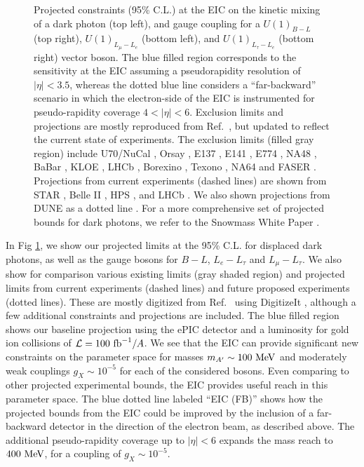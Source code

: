\begin{figure}[t!]
    \caption[Projected constraints at the EIC on the kinetic mixing of a dark photon and gauge strength of anomaly-free abelian theories.]{Projected constraints  (95\% C.L.) at the EIC on the kinetic mixing of a dark photon (top left), and gauge coupling for a $U(1)_{B-L}$ (top right), $U(1)_{L_\mu - L_e}$ (bottom left), and $U(1)_{L_\tau - L_e}$ (bottom right) vector boson. The blue filled region corresponds to the sensitivity at the EIC assuming a pseudorapidity resolution of $|\eta| < 3.5$, whereas the dotted blue line considers a ``far-backward'' scenario in which the electron-side of the EIC is instrumented for pseudo-rapidity coverage $4 < |\eta| < 6$. Exclusion limits and projections are mostly reproduced from Ref.~\cite{Bauer:2018onh}, but updated to reflect the current state of experiments. The exclusion limits (filled gray region) include U70/NuCal \cite{Blumlein:2011mv,Blumlein:2013cua}, Orsay \cite{Davier:1989wz}, E137 \cite{Bjorken:1988as}, E141 \cite{Riordan:1987aw}, E774 \cite{Bross:1989mp}, NA48 \cite{NA482:2015wmo},  BaBar \cite{BaBar:2009lbr,BaBar:2014zli}, KLOE \cite{KLOE-2:2011hhj,KLOE-2:2012lii,KLOE-2:2016ydq}, LHCb \cite{LHCb:2017trq}, Borexino \cite{Harnik:2012ni}, Texono \cite{Lindner:2018kjo}, NA64 \cite{Banerjee:2019pds} and FASER \cite{FASER:2018eoc}. Projections from current experiments (dashed lines) are shown from STAR \cite{Xu:2022qme}, Belle II \cite{Belle-II:2018jsg}, HPS \cite{Baltzell:2022rpd}, and LHCb \cite{Ilten:2015hya,Ilten:2016tkc}. We also shown projections from DUNE as a dotted line \cite{Wise:2018rnb}. For a more comprehensive set of projected bounds for dark photons, we refer to the Snowmass White Paper \cite{Batell:2022dpx}.}
    \label{fig:dark_bosons_EIC}
\end{figure}



In Fig \ref{fig:dark_bosons_EIC}, we show our projected limits at the 95\% C.L. for displaced dark photons, as well as the gauge bosons for $B-L$, $L_e - L_\tau$ and $L_\mu - L_\tau$. We also show for comparison various existing limits (gray shaded region) and projected limits from current experiments (dashed lines) and future proposed experiments (dotted lines). These are mostly digitized from Ref.~\cite{Bauer:2018onh} using DigitizeIt \cite{DigitizeIt}, although a few additional constraints and projections are included. The blue filled region shows our baseline projection using the ePIC detector and a luminosity for gold ion collisions of ${\cal L} = 100~{\rm fb}^{-1} / A$. We see that the EIC can provide significant new constraints on the parameter space for masses $m_{A'} \sim 100~{\rm MeV}$ and moderately weak couplings $g_{X} \sim 10^{-5}$ for each of the considered bosons. Even comparing to other projected experimental bounds, the EIC provides useful reach in this parameter space. The blue dotted line labeled ``EIC (FB)'' shows how the projected bounds from the EIC could be improved by the inclusion of a far-backward detector in the direction of the electron beam, as described above. The additional pseudo-rapidity coverage up to $|\eta| < 6$ expands the mass reach to $400~{\rm MeV}$, for a coupling of $g_{X} \sim 10^{-5}$.




